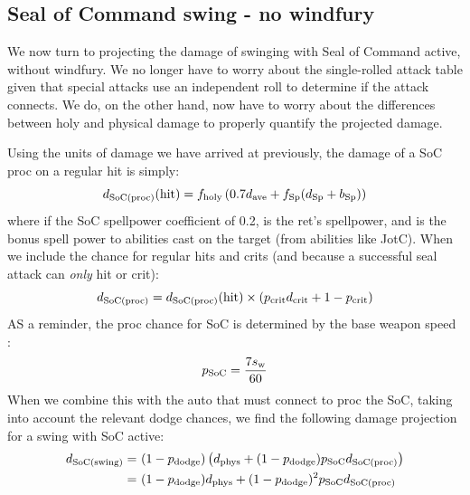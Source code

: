 \subsection{Seal of Command swing - no windfury}
We now turn to projecting the damage of swinging with Seal of Command active, without windfury.
We no longer have to worry about the single-rolled attack table given that special attacks use an independent roll to determine if the attack connects.
We do, on the other hand, now have to worry about the differences between holy and physical damage to properly quantify the projected damage.

Using the units of damage we have arrived at previously, the damage of a SoC proc on a regular hit is simply:
\begin{equation}
	d_\mathrm{SoC(proc)} (\mathrm{hit}) = f_{\mathrm{holy}}  \left( 0.7  d_{\mathrm{ave}}  + f_{\mathrm{Sp}}  (d_\mathrm{Sp}  + b_\mathrm{Sp} ) \right)
\end{equation}
where \fspell if the SoC spellpower coefficient of 0.2, \dspell is the ret's spellpower, and \bspell is the bonus spell power to abilities cast on the target (from abilities like JotC).
When we include the chance for regular hits and crits (and because a successful seal attack can \emph{only} hit or crit):
\begin{equation}
	d_\mathrm{SoC(proc)}  = d_\mathrm{SoC(proc)} (\mathrm{hit}) \times ( p_{\mathrm{crit}}  d_{\mathrm{crit}}  + 1 - p_{\mathrm{crit}} )
\end{equation}
AS a reminder, the proc chance for SoC is determined by the base weapon speed \ws:
\begin{equation}
	p_\mathrm{SoC}   = \frac{7 s_\mathrm{w} }{60}
\end{equation}
When we combine this with the auto that must connect to proc the SoC, taking into account the relevant dodge chances, we find the following damage projection for a swing with SoC active:
\begin{equation*}
	\begin{aligned}
		d_\mathrm{SoC(swing)}  =&~ (1-p_{\mathrm{dodge}} ) \left( d_{\mathrm{phys}}  + (1 - p_{\mathrm{dodge}} ) p_\mathrm{SoC}   d_\mathrm{SoC(proc)}  \right) \\
		=&~ (1 - p_{\mathrm{dodge}} ) d_{\mathrm{phys}}  + (1 - p_{\mathrm{dodge}} )^2 p_\mathrm{SoC}   d_\mathrm{SoC(proc)} \\
	\end{aligned}
\end{equation*}

